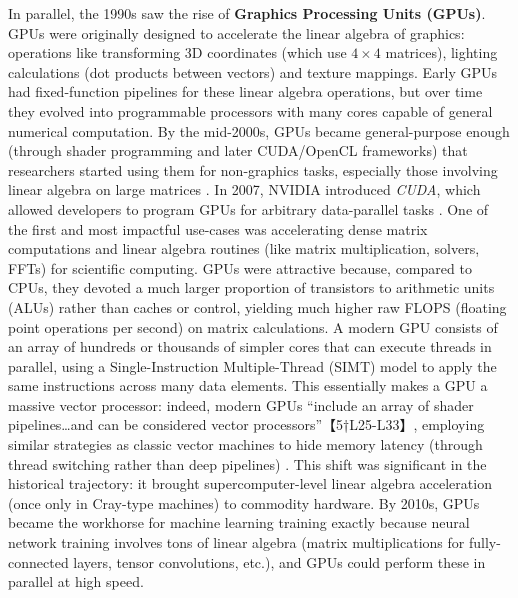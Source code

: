 In parallel, the 1990s saw the rise of \textbf{Graphics Processing Units (GPUs)}. GPUs were originally designed to accelerate the linear algebra of graphics: operations like transforming 3D coordinates (which use $4\times4$ matrices), lighting calculations (dot products between vectors) and texture mappings. Early GPUs had fixed-function pipelines for these linear algebra operations, but over time they evolved into programmable processors with many cores capable of general numerical computation. By the mid-2000s, GPUs became general-purpose enough (through shader programming and later CUDA/OpenCL frameworks) that researchers started using them for non-graphics tasks, especially those involving linear algebra on large matrices \cite{owens2008gpu, luebke2004gpgpu, kruger2003linear}. In 2007, NVIDIA introduced \emph{CUDA}, which allowed developers to program GPUs for arbitrary data-parallel tasks \cite{nvidia2007cuda, nickolls2008scalable}. One of the first and most impactful use-cases was accelerating dense matrix computations and linear algebra routines (like matrix multiplication, solvers, FFTs) for scientific computing. GPUs were attractive because, compared to CPUs, they devoted a much larger proportion of transistors to arithmetic units (ALUs) rather than caches or control, yielding much higher raw FLOPS (floating point operations per second) on matrix calculations. A modern GPU consists of an array of hundreds or thousands of simpler cores that can execute threads in parallel, using a Single-Instruction Multiple-Thread (SIMT) model to apply the same instructions across many data elements. This essentially makes a GPU a massive vector processor: indeed, modern GPUs “include an array of shader pipelines…and can be considered vector processors”【5†L25-L33】, employing similar strategies as classic vector machines to hide memory latency (through thread switching rather than deep pipelines) \cite{lindholm2008nvidia, nickolls2010gpu, seiler2010fermi, che2008accelerating}. This shift was significant in the historical trajectory: it brought supercomputer-level linear algebra acceleration (once only in Cray-type machines) to commodity hardware. By 2010s, GPUs became the workhorse for machine learning training exactly because neural network training involves tons of linear algebra (matrix multiplications for fully-connected layers, tensor convolutions, etc.), and GPUs could perform these in parallel at high speed.

